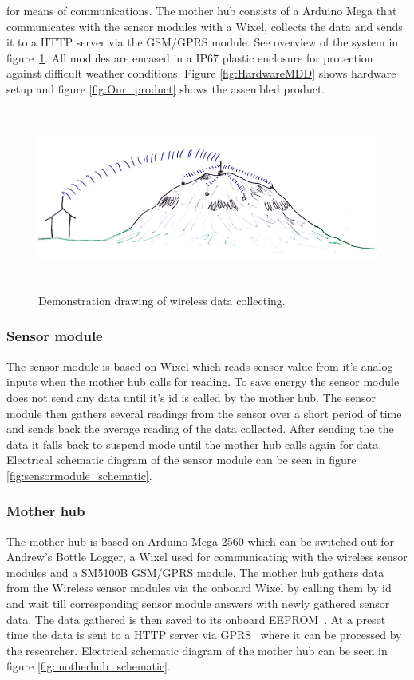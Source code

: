 for means of communications. The mother hub consists of a Arduino Mega\cite{arduinoMega}
that communicates with the sensor modules with a Wixel, collects the data 
and sends it to a HTTP server via the GSM/GPRS module\cite{SM5100B}. See overview of the system in figure~\ref{fig:datalogging}. All modules are 
encased in a IP67\cite{ipRating} plastic enclosure for protection against difficult weather conditions.
Figure \ref{fig:HardwareMDD} shows hardware setup and figure \ref{fig:Our_product} shows the assembled 
product. 
\begin{figure}[H]
		\centering
        \includegraphics[height=6cm]{graphics/GeoLog.PNG}
        \caption{Demonstration drawing of wireless data collecting.}
        \label{fig:datalogging}
\end{figure}
\subsubsection{Sensor module}
The sensor module is based on Wixel\cite{wixel} which reads sensor value from it's
analog inputs when the mother hub calls for reading. To save energy the sensor module does
not send any data until it's id is called by the mother hub. The sensor module then 
gathers several readings from the sensor over a short period of time and sends back the 
average reading of the data collected. After sending the the data it falls back to suspend mode until the mother 
hub calls again for data. Electrical schematic diagram of the sensor module can
be seen in figure \ref{fig:sensormodule_schematic}.
\subsubsection{Mother hub}
The mother hub is based on Arduino Mega 2560\cite{arduinoMega} which can be switched out 
for Andrew's Bottle Logger\cite{ALog-BottleLogger}, a Wixel\cite{wixel} used for 
communicating with the wireless sensor modules and a SM5100B GSM/GPRS 
module\cite{SM5100B}. The mother hub gathers data from the Wireless sensor modules via 
the onboard Wixel by calling them by id and wait till corresponding sensor module answers
with newly gathered sensor data. The data gathered is then saved to its onboard EEPROM~\cite{EEPROM}.
At a preset time the data is sent to a HTTP server via GPRS~\cite{GPRS} where it can be processed 
by the researcher. Electrical schematic diagram of the mother hub can be seen in figure 
\ref{fig:motherhub_schematic}.
